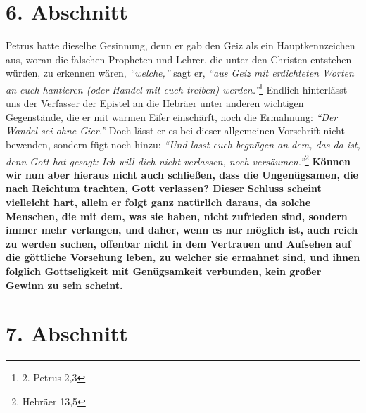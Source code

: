\section{6. Abschnitt} \label{kap13_ab6}

Petrus  hatte dieselbe Gesinnung, denn er gab den Geiz
als ein Hauptkennzeichen
aus, woran die falschen Propheten und Lehrer,
die unter den Christen entstehen
würden, zu erkennen wären, \textit{"`welche,"'} sagt er, \textit{"`aus Geiz mit
erdichteten
Worten an euch hantieren (oder Handel mit euch treiben) werden."'}\footnote{2. Petrus 2,3}
Endlich hinterlässt uns der Verfasser der Epistel an die Hebräer
unter anderen wichtigen Gegenstände, die er mit warmen Eifer einschärft, noch die
Ermahnung: \textit{"`Der Wandel sei ohne Gier."'} Doch lässt er es bei dieser
allgemeinen
Vorschrift nicht bewenden, sondern fügt noch hinzu:
\textit{"`Und lasst euch begnügen an
dem, das da ist, denn Gott hat gesagt: Ich will dich nicht verlassen, noch
versäumen."'}\footnote{Hebräer 13,5}
 \label{ref:13_06_reichtum_unersaettlichkeit}
\textbf{Können wir nun aber hieraus nicht auch
schließen, dass die Ungenügsamen, die nach
Reichtum trachten, Gott verlassen?
Dieser Schluss scheint vielleicht hart, allein er folgt ganz natürlich daraus, da
solche Menschen, die mit dem, was sie haben, nicht zufrieden sind, sondern immer
mehr verlangen, und daher, wenn es nur möglich ist, auch reich zu werden suchen,
offenbar nicht in dem Vertrauen und Aufsehen auf die göttliche Vorsehung leben,
zu welcher sie ermahnet sind, und ihnen folglich Gottseligkeit mit Genügsamkeit
verbunden, kein großer Gewinn zu sein scheint.}

\section{7. Abschnitt} \label{kap13_ab7}

